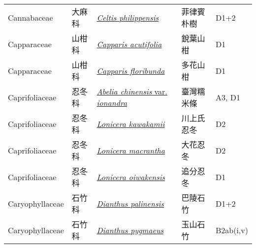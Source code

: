 {\begin{longtable}{L{2.5cm}L{2cm}L{5cm}L{2.5cm}L{3cm}}
    Cannabaceae & 大麻科 & \href{http://www.theplantlist.org/tpl1.1/search?q=Celtis+philippensis}{\textit{Celtis philippensis} } & 菲律賓朴樹 & D1+2    \\
    Capparaceae & 山柑科 & \href{http://www.theplantlist.org/tpl1.1/search?q=Capparis+acutifolia}{\textit{Capparis acutifolia} } & 銳葉山柑 & D1    \\
    Capparaceae & 山柑科 & \href{http://www.theplantlist.org/tpl1.1/search?q=Capparis+floribunda}{\textit{Capparis floribunda} } & 多花山柑 & D1    \\
    Caprifoliaceae & 忍冬科 & \href{http://www.theplantlist.org/tpl1.1/search?q=Abelia+chinensis+var.+ionandra}{\textit{Abelia chinensis} var. \textit{ionandra} } & 臺灣糯米條 & A3, D1    \\
    Caprifoliaceae & 忍冬科 & \href{http://www.theplantlist.org/tpl1.1/search?q=Lonicera+kawakamii}{\textit{Lonicera kawakamii} } & 川上氏忍冬 & D2    \\
    Caprifoliaceae & 忍冬科 & \href{http://www.theplantlist.org/tpl1.1/search?q=Lonicera+macrantha}{\textit{Lonicera macrantha} } & 大花忍冬 & D2    \\
    Caprifoliaceae & 忍冬科 & \href{http://www.theplantlist.org/tpl1.1/search?q=Lonicera+oiwakensis}{\textit{Lonicera oiwakensis} } & 追分忍冬 & D1    \\
    Caryophyllaceae & 石竹科 & \href{http://www.theplantlist.org/tpl1.1/search?q=Dianthus+palinensis}{\textit{Dianthus palinensis} } & 巴陵石竹 & D1+2    \\
    Caryophyllaceae & 石竹科 & \href{http://www.theplantlist.org/tpl1.1/search?q=Dianthus+pygmaeus}{\textit{Dianthus pygmaeus} } & 玉山石竹 & B2ab(i,v)    \\

\end{longtable}}

